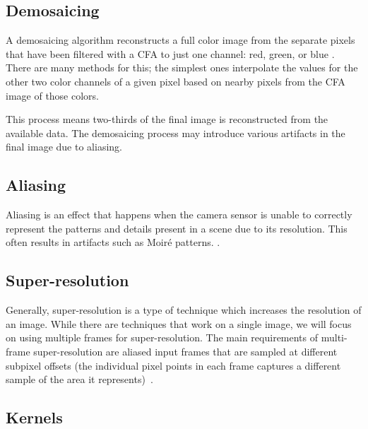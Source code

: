 \documentclass{sig-alternate}
\begin{document}
\subsection{Demosaicing}
\label{sec:background:demosaicing}

A demosaicing algorithm reconstructs a full color image from the separate pixels that have been filtered with a CFA to just one channel: red, green, or blue \cite{wiki:Demosaicing}. There are many methods for this; the simplest ones interpolate the values for the other two color channels of a given pixel based on nearby pixels from the CFA image of those colors.

This process means two-thirds of the final image is reconstructed from the available data. The demosaicing process may introduce various artifacts in the final image due to aliasing.~\cite{blog:Wronski2018}

\subsection{Aliasing}
\label{sec:background:aliasing}

Aliasing is an effect that happens when the camera sensor is unable to correctly represent the patterns and details present in a scene due to its resolution. This often results in artifacts such as Moiré patterns. \cite{blog:Wronski2018}.


\subsection{Super-resolution}
\label{sec:background:superResolution}

Generally, super-resolution is a type of technique which increases the resolution of an image. While there are techniques that work on a single image, we will focus on using multiple frames for super-resolution. 
The main requirements of multi-frame super-resolution are aliased input frames that are sampled at different subpixel offsets (the individual pixel points in each frame captures a different sample of the area it represents)~\cite{Wronski2019}. 


\subsection{Kernels}
\label{sec:background:kernels}
\end{document}
